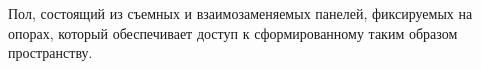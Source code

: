 Пол, состоящий из съемных и взаимозаменяемых панелей,
фиксируемых на опорах, который обеспечивает доступ к
сформированному таким образом пространству.